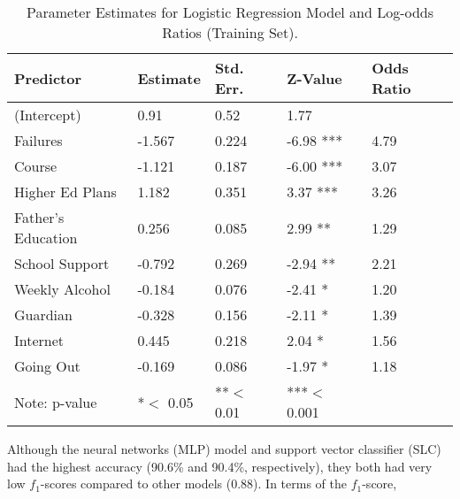 \begin{table}
  \caption{Parameter Estimates for Logistic Regression Model and Log-odds 
  Ratios (Training Set).}
  \label{tab:freq}
  \begin{tabular}{lllll}
    \toprule
    Predictor&  Estimate& Std. Err.& Z-Value & Odds Ratio \\    
    \midrule
    (Intercept)         &   0.91 &  0.52 &   1.77     &   \\
    Failures            &  -1.567 &  0.224 &  -6.98 ***  &  4.79  \\
    Course              &  -1.121 &  0.187 &  -6.00 ***  &  3.07  \\
    Higher Ed Plans     &   1.182 &  0.351 &   3.37 ***  &  3.26  \\
    Father's Education  &   0.256 &  0.085 &   2.99 **   &  1.29  \\ 
    School Support      &  -0.792 &  0.269 &  -2.94 **   &  2.21  \\    
    Weekly Alcohol      &  -0.184 &  0.076 &  -2.41 *    &  1.20  \\
    Guardian            &  -0.328 &  0.156 &  -2.11 *    &  1.39  \\
    Internet            &   0.445 &  0.218 &   2.04 *    &  1.56  \\
    Going Out           &  -0.169 &  0.086 &  -1.97 *    &  1.18  \\
    \bottomrule 
    Note: p-value& *$<$ 0.05  & **$<$ 0.01 & ***$<$ 0.001 &   
  \end{tabular}
\end{table}









Although the neural networks (MLP) model and support vector classifier (SLC) 
had the highest accuracy (90.6\% and 90.4\%, respectively), they both had very 
low $f_1$-scores compared to other models (0.88). In terms of the $f_1$-score, 


